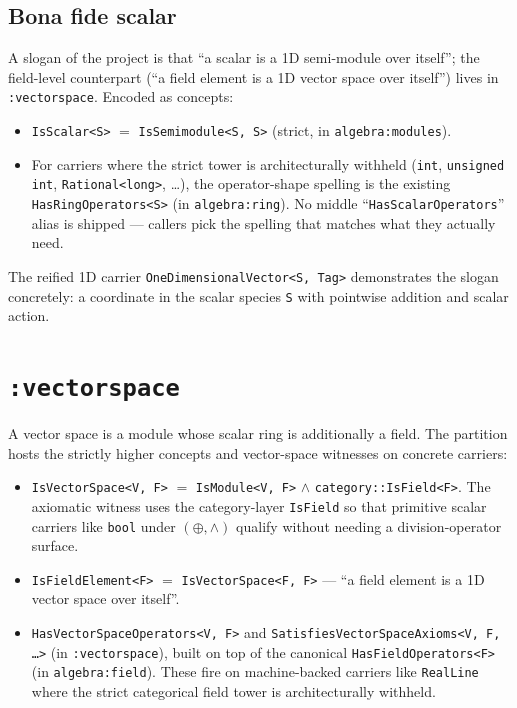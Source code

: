 \documentclass[11pt, a4paper]{report}
\begin{document}
\subsection{Bona fide scalar}
\label{subsec:algebra-modules-bona-fide}

A slogan of the project is that ``a scalar is a 1D semi-module over itself''; the field-level counterpart (``a field element is a 1D vector space over itself'') lives in \texttt{:vectorspace}. Encoded as concepts:

\begin{itemize}
  \item \texttt{IsScalar<S>} $= $ \texttt{IsSemimodule<S, S>} (strict, in \texttt{algebra:modules}).
  \item For carriers where the strict tower is architecturally withheld (\texttt{int}, \texttt{unsigned int}, \texttt{Rational<long>}, \ldots), the operator-shape spelling is the existing \texttt{HasRingOperators<S>} (in \texttt{algebra:ring}).  No middle ``\texttt{HasScalarOperators}'' alias is shipped --- callers pick the spelling that matches what they actually need.
\end{itemize}

The reified 1D carrier \texttt{OneDimensionalVector<S, Tag>} demonstrates the slogan concretely: a coordinate in the scalar species \texttt{S} with pointwise addition and scalar action.

\section{\texttt{:vectorspace}}
\label{sec:algebra-vectorspace}

A vector space is a module whose scalar ring is additionally a field. The partition hosts the strictly higher concepts and vector-space witnesses on concrete carriers:

\begin{itemize}
  \item \texttt{IsVectorSpace<V, F>} $= $ \texttt{IsModule<V, F>} $\wedge$ \texttt{category::IsField<F>}. The axiomatic witness uses the category-layer \texttt{IsField} so that primitive scalar carriers like \texttt{bool} under $(\oplus, \wedge)$ qualify without needing a division-operator surface.
  \item \texttt{IsFieldElement<F>} $= $ \texttt{IsVectorSpace<F, F>} --- ``a field element is a 1D vector space over itself''.
  \item \texttt{HasVectorSpaceOperators<V, F>} and \texttt{SatisfiesVectorSpaceAxioms<V, F, \ldots>} (in \texttt{:vectorspace}), built on top of the canonical \texttt{HasFieldOperators<F>} (in \texttt{algebra:field}).  These fire on machine-backed carriers like \texttt{RealLine} where the strict categorical field tower is architecturally withheld.
\end{itemize}
\end{document}
